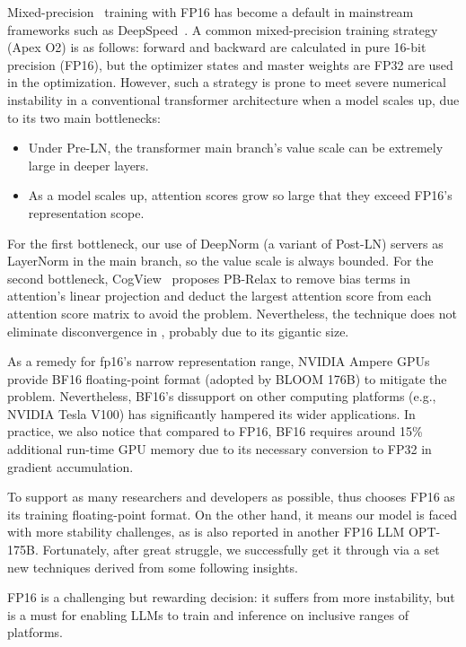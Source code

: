 { 
Mixed-precision~\citep{micikevicius2018mixed} training with FP16 has become a default in mainstream frameworks such as DeepSpeed~\citep{rasley2020deepspeed}.
A common mixed-precision training strategy (Apex O2) is as follows: forward and backward are calculated in pure 16-bit precision (FP16), but the optimizer states and master weights are FP32 are used in the optimization.
However, such a strategy is prone to meet severe numerical instability in a conventional transformer architecture when a model scales up, due to its two main bottlenecks:
\begin{itemize}[leftmargin=*,itemsep=0pt,parsep=0.2em,topsep=0.0em,partopsep=0.0em]
    \item Under Pre-LN, the transformer main branch's value scale can be extremely large in deeper layers.
    \item As a model scales up, attention scores grow so large that they exceed FP16's representation scope.
\end{itemize}

For the first bottleneck, our use of DeepNorm (a variant of Post-LN) servers as LayerNorm in the main branch, so the value scale is always bounded. 
For the second bottleneck, CogView~\citep{ding2021cogview} proposes PB-Relax to remove bias terms in attention's linear projection and deduct the largest attention score from each attention score matrix to avoid the problem. 
Nevertheless, the technique does not eliminate disconvergence in \glm, probably due to its gigantic size.
 
As a remedy for fp16's narrow representation range, NVIDIA Ampere GPUs provide BF16 floating-point format (adopted by BLOOM 176B) to mitigate the problem. 
Nevertheless, BF16's dissupport on other computing platforms (e.g., NVIDIA Tesla V100) has significantly hampered its wider applications.
In practice, we also notice that compared to FP16, BF16 requires around 15\% additional run-time GPU memory due to its necessary conversion to FP32 in gradient accumulation.

To support as many researchers and developers as possible, \glm thus chooses FP16 as its training floating-point format. 
On the other hand, it means our model is faced with more stability challenges, as is also reported in another FP16 LLM OPT-175B. 
Fortunately, after great struggle, we successfully get it through via a set new techniques derived from some following insights.

\begin{insight}
\rm FP16 is a challenging but rewarding decision: it suffers from more instability, but is a must for enabling LLMs to train and inference on inclusive ranges of platforms.
\end{insight}

}

